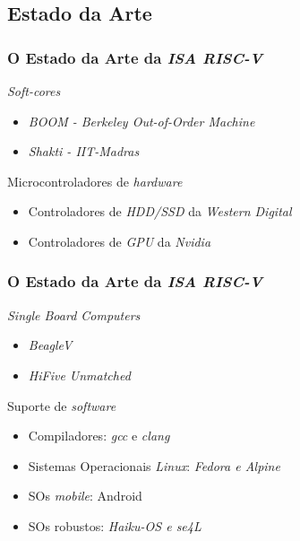 \documentclass[aspectratio=169]{beamer}
\begin{document}
    \subsection{Estado da Arte}
    \begin{frame}
        \frametitle{O Estado da Arte da \textit{ISA RISC-V}}
        \vfill
        \begin{block}{\textit{Soft-cores}}
            \begin{itemize}
                \item \textit{BOOM - Berkeley Out-of-Order Machine}
                \item \textit{Shakti - IIT-Madras}
            \end{itemize}
        \end{block}
        \vfill
        \begin{block}{Microcontroladores de \textit{hardware}}
            \begin{itemize}
                \item Controladores de \textit{HDD/SSD} da \textit{Western Digital}
                \item Controladores de \textit{GPU} da \textit{Nvidia}
            \end{itemize}
        \end{block}
        \vfill
    \end{frame}

    \begin{frame}
        \frametitle{O Estado da Arte da \textit{ISA RISC-V}}
        \vfill
        \begin{block}{\textit{Single Board Computers}}
            \begin{itemize}
                \item \textit{BeagleV}
                \item \textit{HiFive Unmatched}
            \end{itemize}
        \end{block}
        \vfill
        \begin{block}{Suporte de \textit{software}}
            \begin{itemize}
                \item Compiladores: \textit{gcc} e \textit{clang}
                \item Sistemas Operacionais \textit{Linux}: \textit{Fedora e Alpine}
                \item SOs \textit{mobile}: Android
                \item SOs robustos: \textit{Haiku-OS e se4L}
            \end{itemize}
        \end{block}
        \vfill
    \end{frame}
\end{document}

